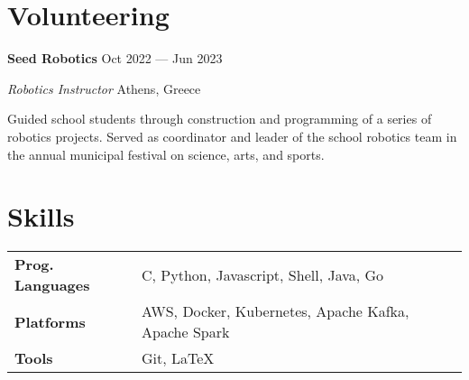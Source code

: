 \documentclass[margin,12pt]{resume}
\newcommand{\descriptionVSpace}{\vspace{0.5ex}\xspace}
\newcommand{\subsectionVSpace}{\vspace{3.5ex}\xspace}
\newcommand{\sectionVSpace}{\vspace{1ex}\xspace} %
\newcommand{\sectionVSpaceCorrection}{\vspace{-3.5ex}} %
\newcommand{\header}[1]{\textbf{#1}\xspace}
\newcommand{\institution}[1]{\header{#1}\xspace}
\newcommand{\interval}[2]{#1 --- #2\xspace}
\newcommand{\place}[1]{#1\xspace}
\newcommand{\project}[2]{\header{\href{#2}{#1}}}
\newcommand{\role}[1]{\textit{#1}\xspace}
\newcommand{\seminar}[1]{\header{#1}\xspace}
\newcommand{\singleDate}[1]{#1\xspace}
\newenvironment{rSubsection}{}{\par\subsectionVSpace}
\newenvironment{rSection}[1]{\sectionVSpaceCorrection\section{#1}\xspace}{\sectionVSpace\par}
\newenvironment{jobDuties}{\descriptionVSpace}{\par}
\newenvironment{projectDescription}{\descriptionVSpace}{\par}
\newenvironment{seminarDescription}{\descriptionVSpace}{\par}
\begin{document}
\begin{resume}




    \begin{rSection}{Volunteering}
        \begin{rSubsection}
            \institution{Seed Robotics} \hfill \interval{Oct 2022}{Jun 2023}

            \role{Robotics Instructor} \hfill \place{Athens, Greece}

            \begin{jobDuties}
                Guided school students through construction and programming of a series of robotics projects. 
                Served as coordinator and leader of the school robotics team in the annual municipal festival on science, arts, and sports.
            \end{jobDuties}
        \end{rSubsection}
    \end{rSection}

    \begin{rSection}{Skills}
        \begin{rSubsection}
            \begin{tabular}{@{} >{\bfseries}l l @{}}
                Prog. Languages & C, Python, Javascript, Shell, Java, Go              \\
                Platforms       & AWS, Docker, Kubernetes, Apache Kafka, Apache Spark \\
                Tools           & Git, LaTeX
            \end{tabular}
        \end{rSubsection}
    \end{rSection}


\end{resume}
\end{document}
